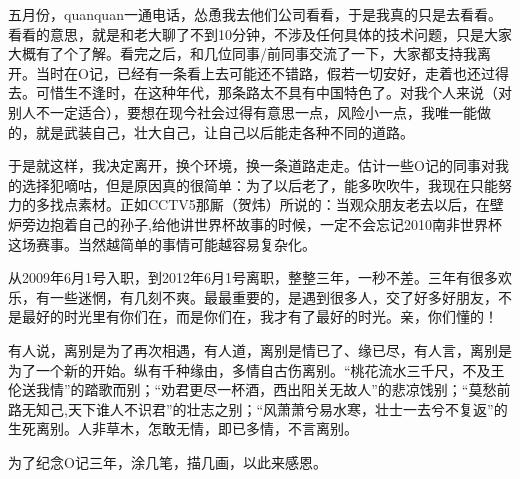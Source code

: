 五月份，quanquan一通电话，怂恿我去他们公司看看，于是我真的只是去看看。看看的意思，就是和老大聊了不到10分钟，不涉及任何具体的技术问题，只是大家大概有了个了解。看完之后，和几位同事/前同事交流了一下，大家都支持我离开。当时在O记，已经有一条看上去可能还不错路，假若一切安好，走着也还过得去。可惜生不逢时，在这种年代，那条路太不具有中国特色了。对我个人来说（对别人不一定适合），要想在现今社会过得有意思一点，风险小一点，我唯一能做的，就是武装自己，壮大自己，让自己以后能走各种不同的道路。

于是就这样，我决定离开，换个环境，换一条道路走走。估计一些O记的同事对我的选择犯嘀咕，但是原因真的很简单：为了以后老了，能多吹吹牛，我现在只能努力的多找点素材。正如CCTV5那厮（贺炜）所说的：当观众朋友老去以后，在壁炉旁边抱着自己的孙子,给他讲世界杯故事的时候，一定不会忘记2010南非世界杯这场赛事。当然越简单的事情可能越容易复杂化。

从2009年6月1号入职，到2012年6月1号离职，整整三年，一秒不差。三年有很多欢乐，有一些迷惘，有几刻不爽。最最重要的，是遇到很多人，交了好多好朋友，不是最好的时光里有你们在，而是你们在，我才有了最好的时光。亲，你们懂的！

有人说，离别是为了再次相遇，有人道，离别是情已了、缘已尽，有人言，离别是为了一个新的开始。纵有千种缘由，多情自古伤离别。“桃花流水三千尺，不及王伦送我情”的踏歌而别；“劝君更尽一杯酒，西出阳关无故人”的悲凉饯别；“莫愁前路无知己,天下谁人不识君”的壮志之别；“风萧萧兮易水寒，壮士一去兮不复返”的生死离别。人非草木，怎敢无情，即已多情，不言离别。

为了纪念O记三年，涂几笔，描几画，以此来感恩。
